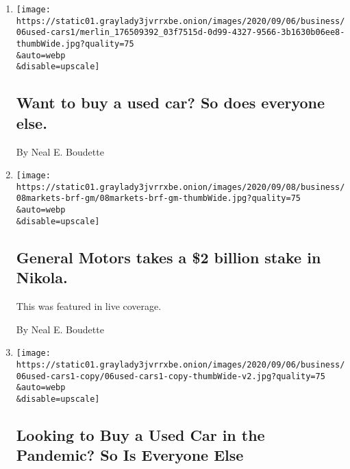 \begin{enumerate}
\def\labelenumi{\arabic{enumi}.}
\item
  \href{/2020/09/08/business/want-to-buy-a-used-car-so-does-everyone-else.html}{}

  \texttt{[image: https://static01.graylady3jvrrxbe.onion/images/2020/09/06/business/06used-cars1/merlin\_176509392\_03f7515d-0d99-4327-9566-3b1630b06ee8-thumbWide.jpg?quality=75\\\&auto=webp\\\&disable=upscale]}

  \hypertarget{want-to-buy-a-used-car-so-does-everyone-else}{%
  \subsection{Want to buy a used car? So does everyone
  else.}\label{want-to-buy-a-used-car-so-does-everyone-else}}

  By Neal E. Boudette
\item
  \href{/live/2020/09/08/business/stock-market-today-coronavirus/general-motors-takes-a-2-billion-stake-in-nikola}{}

  \texttt{[image: https://static01.graylady3jvrrxbe.onion/images/2020/09/08/business/08markets-brf-gm/08markets-brf-gm-thumbWide.jpg?quality=75\\\&auto=webp\\\&disable=upscale]}

  \hypertarget{general-motors-takes-a-2-billion-stake-in-nikola}{%
  \subsection{General Motors takes a \$2 billion stake in
  Nikola.}\label{general-motors-takes-a-2-billion-stake-in-nikola}}

  This was featured in live coverage.

  By Neal E. Boudette
\item
  \href{/2020/09/07/business/used-cars-pandemic.html}{}

  \texttt{[image: https://static01.graylady3jvrrxbe.onion/images/2020/09/06/business/06used-cars1-copy/06used-cars1-copy-thumbWide-v2.jpg?quality=75\\\&auto=webp\\\&disable=upscale]}

  \hypertarget{looking-to-buy-a-used-car-in-the-pandemic-so-is-everyone-else}{%
  \subsection{Looking to Buy a Used Car in the Pandemic? So Is Everyone
  Else}\label{looking-to-buy-a-used-car-in-the-pandemic-so-is-everyone-else}}


\end{enumerate}

